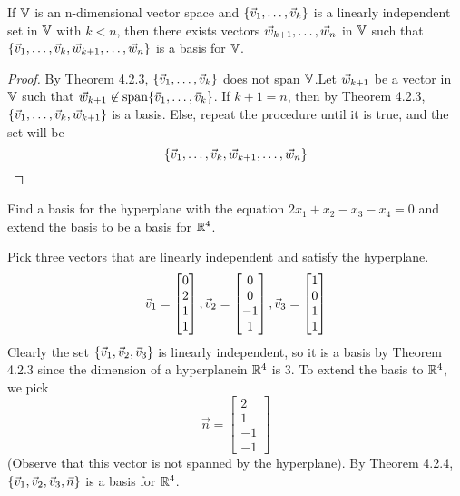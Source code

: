 \documentclass[english, 12pt]{article}
\begin{document}
\begin{thrm}
If ${\mathbb{V}}$ is an n-dimensional vector space and $\{\vec{v}_1,\dots,\vec{v}_k\}$ is a linearly independent set in ${\mathbb{V}}$ with $k < n$, then there exists vectors $\vec{w}_{k+1},\dots,\vec{w}_{n}$ in ${\mathbb{V}}$ such that $\{\vec{v}_1,\dots,\vec{v}_k,\vec{w}_{k+1},\dots,\vec{w}_n\}$ is a basis for ${\mathbb{V}}$.

\begin{proof}
By Theorem 4.2.3, $\{\vec{v}_1,\dots,\vec{v}_k\}$ does not span ${\mathbb{V}}$.Let $\vec{w}_{k+1}$ be a vector in ${\mathbb{V}}$ such that $\vec{w}_{k+1} \not \in \operatorname{span}\{\vec{v}_1,\dots,\vec{v}_k\}$. If $k+1 = n$, then by Theorem 4.2.3, $\{\vec{v}_1,\dots,\vec{v}_k,\vec{w}_{k+1}\}$ is a basis. Else, repeat the procedure until it is true, and the set will be
\[\{\vec{v}_1,\dots,\vec{v}_k,\vec{w}_{k+1},\dots,\vec{w}_n\}\]
\end{proof}
\end{thrm}

\begin{exmp}
Find a basis for the hyperplane with the equation $2x_1 + x_2 - x_3 - x_4 = 0$ and extend the basis to be a basis for ${\mathbb{R}}^4$.

\begin{sol}
Pick three vectors that are linearly independent and satisfy the hyperplane.\\
\[\vec{v}_1 = \begin{bmatrix} 0 \\ 2 \\ 1 \\ 1\end{bmatrix}, \vec{v}_2 = \begin{bmatrix} 0 \\ 0 \\ -1 \\ 1 \end{bmatrix}, \vec{v}_3 = \begin{bmatrix} 1 \\ 0 \\ 1 \\ 1 \end{bmatrix}\]
Clearly the set $\{\vec{v}_1,\vec{v}_2,\vec{v}_3\}$ is linearly independent, so it is a basis by Theorem 4.2.3 since the dimension of a hyperplanein ${\mathbb{R}}^4$ is $3$. To extend the basis to ${\mathbb{R}}^4$, we pick
\[\vec{n} = \begin{bmatrix} 2 \\ 1 \\ -1 \\ -1 \end{bmatrix}\]
(Observe that this vector is not spanned by the hyperplane). By Theorem 4.2.4, $\{\vec{v}_1,\vec{v}_2,\vec{v}_3,\vec{n}\}$ is a basis for ${\mathbb{R}}^4$.
\end{sol}
\end{exmp}
\end{document}
